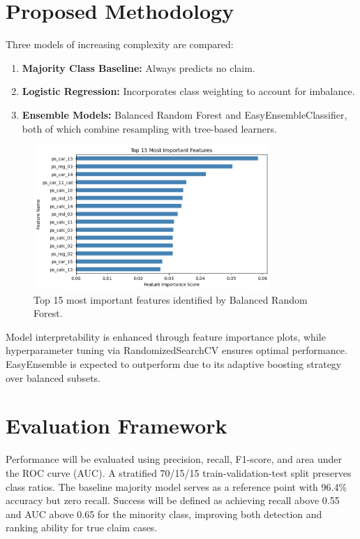 \documentclass[11pt]{article}
\begin{document}
\section{Proposed Methodology}
Three models of increasing complexity are compared:
\begin{enumerate}
    \item \textbf{Majority Class Baseline:} Always predicts no claim.
    \item \textbf{Logistic Regression:} Incorporates class weighting to account for imbalance.
    \item \textbf{Ensemble Models:} Balanced Random Forest and EasyEnsembleClassifier, both of which combine resampling with tree-based learners.
\end{enumerate}
\begin{figure}[h]
    \centering
    \includegraphics[width=0.8\textwidth]{../figures/feature_importance_balanced_rf.png}
    \caption{Top 15 most important features identified by Balanced Random Forest.}
\end{figure}
Model interpretability is enhanced through feature importance plots, while hyperparameter tuning via RandomizedSearchCV ensures optimal performance. EasyEnsemble is expected to outperform due to its adaptive boosting strategy over balanced subsets.

\section{Evaluation Framework}
Performance will be evaluated using precision, recall, F1-score, and area under the ROC curve (AUC). A stratified 70/15/15 train-validation-test split preserves class ratios. The baseline majority model serves as a reference point with 96.4\% accuracy but zero recall. Success will be defined as achieving recall above 0.55 and AUC above 0.65 for the minority class, improving both detection and ranking ability for true claim cases.
\end{document}
